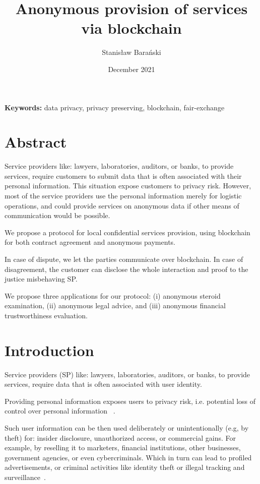 \documentclass{article}
\title{Anonymous provision of services via blockchain}
\author{Stanisław Barański}
\date{December 2021}
\providecommand{\keywords}[1]{\textbf{Keywords:} #1}
\begin{document}
\maketitle
\keywords{data privacy, privacy preserving, blockchain, fair-exchange}



\section{Abstract}
Service providers like: lawyers, laboratories, auditors, or banks, to provide services, require customers to submit data that is often associated with their personal information. This situation expose customers to privacy risk. However, most of the service providers use the personal information merely for logistic operations, and could provide services on anonymous data if other means of communication would be possible.

We propose a protocol for local confidential services provision, using blockchain for both contract agreement and anonymous payments.

In case of dispute, we let the parties communicate over blockchain. In case of disagreement, the customer can disclose the whole interaction and proof to the justice misbehaving SP.

We propose three applications for our protocol: (i) anonymous steroid examination, (ii) anonymous legal advice, and (iii) anonymous financial trustworthiness evaluation.

\section{Introduction}
Service providers (SP) like: lawyers, laboratories, auditors, or banks, to provide services, require data that is often associated with user identity.

Providing personal information exposes users to privacy risk, i.e. potential loss of control over personal information ~\cite{smith2011information}.

Such user information can be then used deliberately or unintentionally (e.g, by theft) for: insider disclosure, unauthorized access, or commercial gains. For example, by reselling it to marketers, financial institutions, other businesses, government agencies, or even cybercriminals. Which in turn can lead to profiled advertisements, or criminal activities like identity theft or illegal tracking and surveillance~\cite{smith2011information}.
\end{document}
